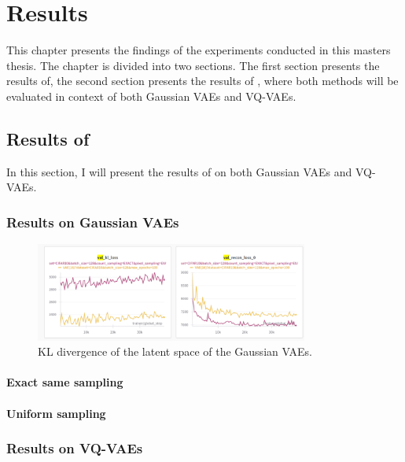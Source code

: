 \chapter{Results}

This chapter presents the findings of the experiments conducted in this masters thesis. The chapter is divided into two sections.
The first section presents the results of, the second section presents the results of ,
 where both methods will be evaluated in context of both Gaussian VAEs and VQ-VAEs.

\section{Results of }

In this section, I will present the results of  on both Gaussian VAEs and VQ-VAEs.

\subsection{Results on Gaussian VAEs}

\begin{figure}[H]
    \centering
    \includegraphics[width=0.8\textwidth]{figures/SCVAE2D_16_CIFAR10.png}
    \caption{KL divergence of the latent space of the Gaussian VAEs.}
    \label{fig:kl_divergence_gaussian_vae}
\end{figure}

\subsubsection{Exact same sampling}

\subsubsection{Uniform sampling}

\subsection{Results on VQ-VAEs}

